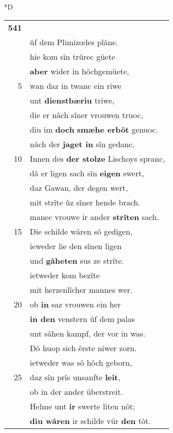 \documentclass[8pt,a4paper,notitlepage]{article}
\begin{document}
\begin{table}[ht]
\begin{minipage}[t]{0.5\linewidth}
\small
\begin{center}*D
\end{center}
\begin{tabular}{rl}
\textbf{541} & \textbf{\begin{large}D\end{large}er} gab ez Gawane\\ 
 & ûf dem Plimizœles plâne.\\ 
 & hie kom sîn trûrec güete\\ 
 & \textbf{aber} wider in hôchgemüete,\\ 
5 & wan daz in twanc ein riwe\\ 
 & unt \textbf{dienstbæriu} triwe,\\ 
 & die er nâch sîner vrouwen truoc,\\ 
 & diu im \textbf{doch} \textbf{smæhe erbôt} genuoc.\\ 
 & nâch der \textbf{jaget in} sîn gedanc.\\ 
10 & Innen des \textbf{der stolze} Lischoys spranc,\\ 
 & dâ er ligen sach sîn \textbf{eigen} swert,\\ 
 & daz Gawan, der degen wert,\\ 
 & mit strîte ûz sîner hende brach.\\ 
 & manec vrouwe ir ander \textbf{strîten} sach.\\ 
15 & Die schilde wâren sô gedigen,\\ 
 & ieweder lie den sînen ligen\\ 
 & und \textbf{gâheten} sus ze strîte.\\ 
 & ietweder kom bezîte\\ 
 & mit herzenlîcher mannes wer.\\ 
20 & ob \textbf{in} saz vrouwen ein her\\ 
 & \textbf{in den} venstern ûf dem palas\\ 
 & unt sâhen kampf, der vor in was.\\ 
 & Dô huop sich êrste niwer zorn.\\ 
 & ietweder was sô hôch geborn,\\ 
25 & daz sîn prîs unsanfte \textbf{leit},\\ 
 & ob in der ander überstreit.\\ 
 & Helme unt \textbf{ir} swerte liten nôt;\\ 
 & \textbf{diu wâren} ir schilde vür \textbf{den} tôt.\\ 

\end{tabular}
\end{minipage}
\end{table}
\end{document}
